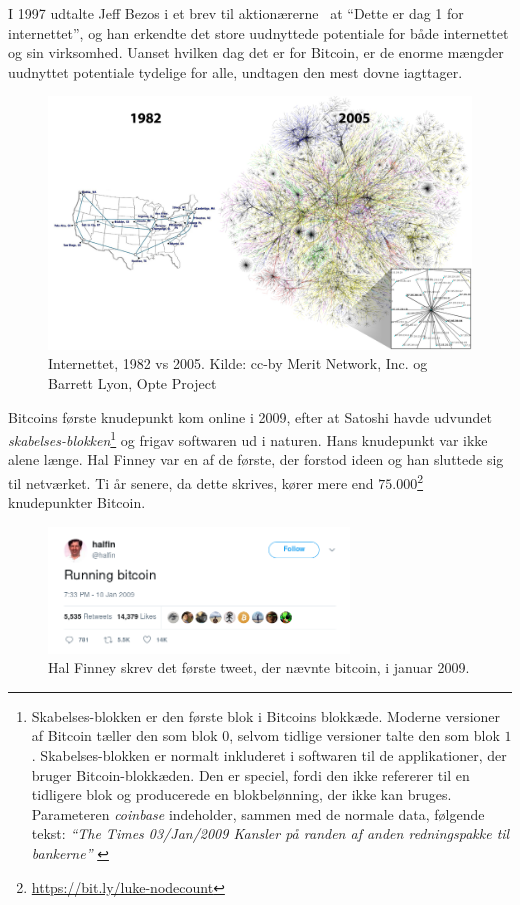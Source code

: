 \documentclass[paper=6in:9in,pagesize=pdftex,
               headinclude=on,footinclude=on,12pt]{scrbook}
\begin{document}
I 1997 udtalte Jeff Bezos i et brev til aktionærerne~\cite{bezos-letter} at \enquote{Dette er dag 1 for internettet}, og han erkendte det store uudnyttede potentiale for både internettet og sin virksomhed. Uanset hvilken dag det er for Bitcoin, er de enorme mængder uudnyttet potentiale tydelige for alle, undtagen den mest dovne iagttager.\begin{figure}
  \includegraphics{assets/images/internet-evolution-white-dates.png}
  \caption{Internettet, 1982 vs 2005. Kilde: cc-by Merit Network, Inc. og Barrett Lyon, Opte Project}
  \label{fig:internet-evolution-white-dates}
\end{figure}

Bitcoins første knudepunkt kom online i 2009, efter at Satoshi havde udvundet \textit{skabelses-blokken}\footnote{Skabelses-blokken er den første blok i Bitcoins blokkæde. Moderne versioner af Bitcoin tæller den som blok $0$, selvom tidlige versioner talte den som blok $1$. Skabelses-blokken er normalt inkluderet i softwaren til de applikationer, der bruger Bitcoin-blokkæden. Den er speciel, fordi den ikke refererer til en tidligere blok og producerede en blokbelønning, der ikke kan bruges. Parameteren \textit{coinbase} indeholder, sammen med de normale data, følgende tekst: \textit{\enquote{The Times 03/Jan/2009 Kansler på randen af anden redningspakke til bankerne}} \cite{btcwiki:genesis-block}} og frigav softwaren ud i naturen. Hans knudepunkt var ikke alene længe. Hal Finney var en af de første, der forstod ideen og han sluttede sig til netværket. Ti år senere, da dette skrives, kører mere end $75.000$\footnote{\url{https://bit.ly/luke-nodecount}} knudepunkter Bitcoin.\begin{figure}
  \centering
  \includegraphics[width=8cm]{assets/images/running-bitcoin.png}
  \caption{Hal Finney skrev det første tweet, der nævnte bitcoin, i januar 2009.}
  \label{fig:running-bitcoin}
\end{figure}
\end{document}
